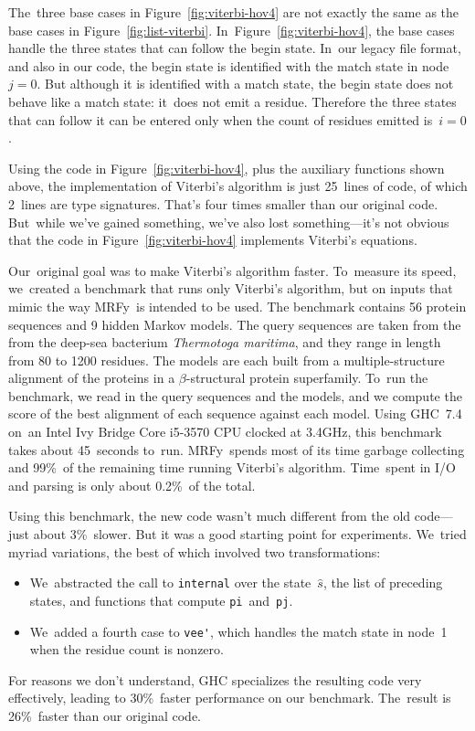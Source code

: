 \documentclass[]{jfp1}
\newcommand\mrfy{MRFy} %
\newcommand\figref[1]{Figure~\ref{fig:#1}}
\begin{document}
The~three base cases in \figref{viterbi-hov4} are not exactly the same
as the base cases in \figref{list-viterbi}.
In~\figref{viterbi-hov4}, the base cases
handle the three states that can
follow the begin state.
In~our legacy file format, and also in our code, the begin state is
identified with the match state in node~$j=0$.
But although it is
identified with a match state, the begin state does not behave like a
match state: it~does not emit a residue.
Therefore the three states that can follow it can be entered only when the
count of residues emitted is~$i=0$.

Using the code in \figref{viterbi-hov4}, plus the auxiliary functions
shown above, the implementation of Viterbi's algorithm is just
25~lines of code, of which 2~lines are type signatures.
That's four times smaller than our original code.
But~while we've gained something, we've also lost something---it's not
obvious that the code in \figref{viterbi-hov4}  implements
Viterbi's equations.

Our~original goal was to make Viterbi's algorithm faster.
To~measure its speed, we~created a benchmark that runs only Viterbi's
algorithm, but on inputs that mimic the way \mrfy\ is intended to be used.
The benchmark contains 56 protein sequences and 9 hidden Markov
models.
The query sequences are taken from the from the deep-sea 
bacterium \emph{Thermotoga maritima}, and they 
range in length from 80 to 1200 residues.
The models are each built from a multiple-structure alignment of the
proteins in 
a $\beta$-structural protein superfamily.
To~run the benchmark, we read in the query sequences and the models,
and we compute the score of the best alignment of each sequence
against each model.
Using GHC~7.4 on~an Intel Ivy Bridge Core i5-3570 CPU clocked at
3.4GHz, this benchmark takes about 45~seconds to~run.
\mrfy\ spends most of its time garbage collecting and 99\%\ of the
remaining time running Viterbi's algorithm.
Time~spent in I/O and parsing is only about 0.2\%~of the
total.

Using this benchmark, the new code wasn't much different from the old
code---just about 3\%~slower.
But it 
was a good starting point for experiments.
We~tried myriad variations, 
the best of which involved two transformations:
\begin{itemize}
\item
We~abstracted the call to \texttt{internal} over the state~$\hat s$,
the list of preceding states, and functions that
compute \texttt{pi}~and~\texttt{pj}.
\item
We~added a fourth case to \verb+vee'+, which handles the match
state in node~1 when the residue count is nonzero.
\end{itemize}
For reasons we don't understand, GHC specializes the resulting code
very effectively, leading to 30\%~faster performance on our
benchmark.
The~result is 26\%~faster than our original code.
\end{document}
